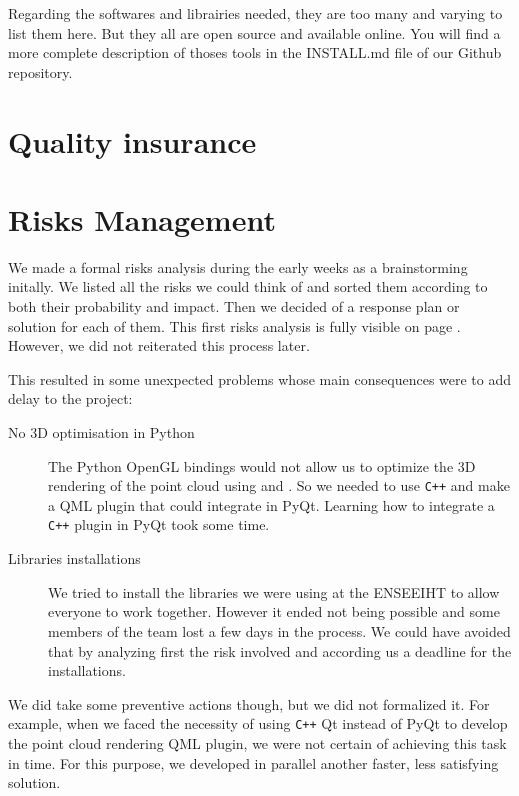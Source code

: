 \noindent
Regarding the softwares and librairies needed,
they are too many and varying to list them here.
But they all are open source and available online.
You will find a more complete description of thoses
tools in the INSTALL.md file of our Github repository.

\section{Quality insurance}

\section{Risks Management}
We made a formal risks analysis during the early weeks as a
brainstorming initally. We listed all the risks we could think of and
sorted them according to both their probability and impact. Then we
decided of a response plan or solution for each of them. This first
risks analysis is fully visible on page \pageref{fig:risks}. However,
we did not reiterated this process later. 

This resulted in some unexpected problems whose main consequences were
to add delay to the project:

\begin{description}
\item[No 3D optimisation in Python] The Python OpenGL bindings would
  not allow us to optimize the 3D rendering of the point cloud using
   and . So we needed
  to use \verb!C++! and make a QML plugin that could integrate in
  PyQt. Learning how to integrate a \verb!C++! plugin in PyQt took some time.
\item[Libraries installations] We tried to install the libraries we
  were using at the ENSEEIHT to allow everyone to work
  together. However it ended not being possible and some members of
  the team lost a few days in the process. We could have avoided that
  by analyzing first the risk involved and according us a deadline for
  the installations.
\end{description}

We did take some preventive actions though, but we did not formalized
it. For example, when we faced the necessity of using \verb!C++! Qt instead
of PyQt to develop the point cloud rendering QML plugin, we were not
certain of achieving this task in time. For this purpose, we developed
in parallel another faster, less satisfying solution.


